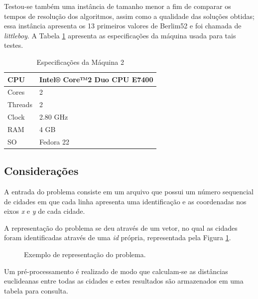 \documentclass[a4paper, 12pt]{article}
\begin{document}
Testou-se também uma instância de tamanho menor a fim de comparar os tempos de resolução dos algoritmos, assim como a qualidade das soluções obtidas; essa instância apresenta os 13 primeiros valores de Berlim52 e foi chamada de \textit{littleboy}. A Tabela \ref{tab:cpu2} apresenta as especificações da máquina usada para tais testes.

\begin{table}[H]

\label{tab:cpu2}
\centering
\begin{tabular}{| l |  l |}
 \hline
 CPU & Intel® Core™2 Duo CPU E7400 \\
 \hline
 Cores & 2\\
 \hline
 Threads & 2\\
 \hline
 Clock & 2.80 GHz\\
 \hline
 RAM & 4 GB \\
 \hline
 SO & Fedora 22 \\
 \hline
\end{tabular}
\caption{Especificações da Máquina 2}
\end{table}


\subsection{Considerações}

A entrada do problema consiste em um arquivo que possui um número sequencial de cidades em que cada linha apresenta uma identificação e as coordenadas nos eixos \textit{x} e \textit{y} de cada cidade.

A representação do problema se deu através de um vetor, no qual as cidades foram identificadas através de uma \textit{id} própria, representada pela Figura \ref{fig:arr}.

\begin{figure}[!ht]
	\centering
	\caption{Exemplo de representação do problema.}
	\label{fig:arr}
\end{figure}

Um pré-processamento é realizado de modo que calculam-se as distâncias euclideanas entre todas as cidades e estes resultados são armazenados em uma tabela para consulta.
\end{document}
